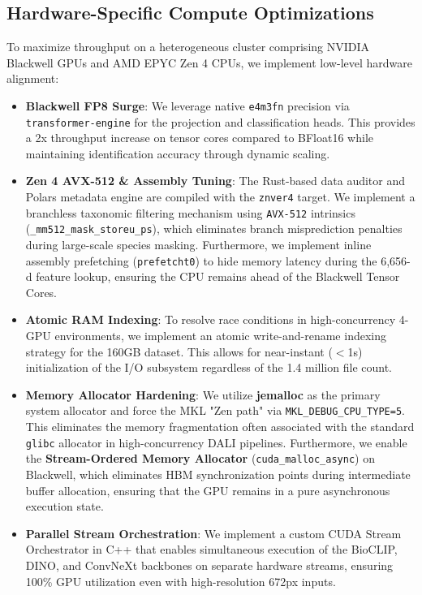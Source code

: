 \documentclass[10pt,twocolumn,letterpaper]{article}
\begin{document}
\subsection{Hardware-Specific Compute Optimizations}
To maximize throughput on a heterogeneous cluster comprising NVIDIA Blackwell GPUs and AMD EPYC Zen 4 CPUs, we implement low-level hardware alignment:
\begin{itemize}
    \item \textbf{Blackwell FP8 Surge}: We leverage native \texttt{e4m3fn} precision via \texttt{transformer-engine} for the projection and classification heads. This provides a 2x throughput increase on tensor cores compared to BFloat16 while maintaining identification accuracy through dynamic scaling.
    \item \textbf{Zen 4 AVX-512 \& Assembly Tuning}: The Rust-based data auditor and Polars metadata engine are compiled with the \texttt{znver4} target. We implement a branchless taxonomic filtering mechanism using \texttt{AVX-512} intrinsics (\texttt{\_mm512\_mask\_storeu\_ps}), which eliminates branch misprediction penalties during large-scale species masking. Furthermore, we implement inline assembly prefetching (\texttt{prefetcht0}) to hide memory latency during the 6,656-d feature lookup, ensuring the CPU remains ahead of the Blackwell Tensor Cores.
    \item \textbf{Atomic RAM Indexing}: To resolve race conditions in high-concurrency 4-GPU environments, we implement an atomic write-and-rename indexing strategy for the 160GB dataset. This allows for near-instant (\(<\)1s) initialization of the I/O subsystem regardless of the 1.4 million file count.
    \item \textbf{Memory Allocator Hardening}: We utilize \textbf{jemalloc} as the primary system allocator and force the MKL "Zen path" via \texttt{MKL\_DEBUG\_CPU\_TYPE=5}. This eliminates the memory fragmentation often associated with the standard \texttt{glibc} allocator in high-concurrency DALI pipelines. Furthermore, we enable the \textbf{Stream-Ordered Memory Allocator} (\texttt{cuda\_malloc\_async}) on Blackwell, which eliminates HBM synchronization points during intermediate buffer allocation, ensuring that the GPU remains in a pure asynchronous execution state.
    \item \textbf{Parallel Stream Orchestration}: We implement a custom CUDA Stream Orchestrator in C++ that enables simultaneous execution of the BioCLIP, DINO, and ConvNeXt backbones on separate hardware streams, ensuring 100\% GPU utilization even with high-resolution 672px inputs.

\end{itemize}
\end{document}
